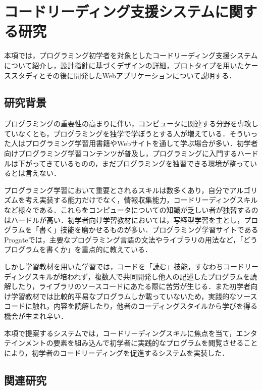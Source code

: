\section{コードリーディング支援システムに関する研究}

本項では，プログラミング初学者を対象としたコードリーディング支援システムについて紹介し，設計指針に基づくデザインの詳細，プロトタイプを用いたケーススタディとその後に開発したWebアプリケーションについて説明する．

\subsection{研究背景}
プログラミングの重要性の高まりに伴い，コンピュータに関連する分野を専攻していなくとも，プログラミングを独学で学ぼうとする人が増えている．そういった人はプログラミング学習用書籍やWebサイトを通して学ぶ場合が多い．初学者向けプログラミング学習コンテンツが普及し，プログラミングに入門するハードルは下がってきているものの，まだプログラミングを独習できる環境が整っているとは言えない．

プログラミング学習において重要とされるスキルは数多くあり，自分でアルゴリズムを考え実装する能力だけでなく，情報収集能力，コードリーディングスキルなど様々である．これらをコンピュータについての知識が乏しい者が独習するのはハードルが高い．初学者向け学習教材においては，写経型学習を主とし，プログラムを「書く」技能を磨かせるものが多い．プログラミング学習サイトであるProgate\cite{progate}では，主要なプログラミング言語の文法やライブラリの用法など，「どうプログラムを書くか」を重点的に教えている．


しかし学習教材を用いた学習では，コードを「読む」技能，すなわちコードリーディングスキルが培われず，複数人で共同開発し他人の記述したプログラムを読解したり，ライブラリのソースコードにあたる際に苦労が生じる．また初学者向け学習教材では比較的平易なプログラムしか載っていないため，実践的なソースコードに触れ，内容を読解したり，他者のコーディングスタイルから学びを得る機会が生まれ辛い．

本項で提案するシステムでは，コードリーディングスキルに焦点を当て，エンタテインメントの要素を組み込んで初学者に実践的なプログラムを閲覧させることにより，初学者のコードリーディングを促進するシステムを実装した．
\subsection{関連研究}

